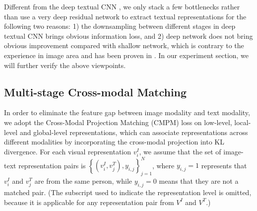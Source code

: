 \documentclass[review]{elsarticle}
\begin{document}
Different from the deep textual CNN \cite{12}, we only stack a few bottlenecks rather than use a very deep residual network to extract textual representations for the following two reasons: 1) the downsampling between different stages in deep textual CNN brings obvious information loss, and 2) deep network does not bring obvious improvement compared with shallow network, which is contrary to the experience in image area and has been proven in \cite{50}. In our experiment section, we will further verify the above viewpoints.

\subsection{Multi-stage Cross-modal Matching}
In order to eliminate the feature gap between image modality and text modality, we adopt the Cross-Modal Projection Matching (CMPM) loss \cite{14} on low-level, local-level and global-level representations, which can associate representations across different modalities by incorporating the cross-modal projection into KL divergence. For each visual representation $v_i^I$, we assume that the set of image-text representation pairs is $\left\{ {\left( {v_i^I,v_j^T} \right),{y_{i,j}}} \right\}_{j = 1}^N$, where ${y_{i,j}} = 1$ represents that $v_i^I$ and $v_j^T$ are from the same person, while ${y_{i,j}} = 0$ means that they are not a matched pair. (The subscript used to indicate the representation level is omitted, because it is applicable for any representation pair from ${V^I}$ and ${V^T}$.)
\end{document}
